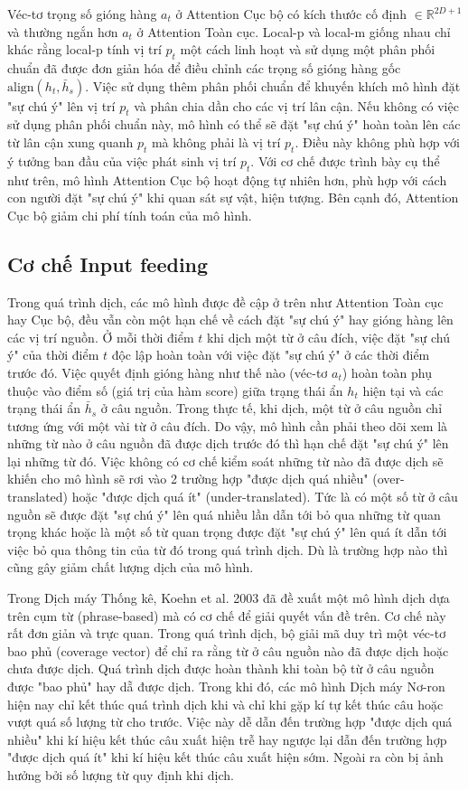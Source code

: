  Véc-tơ trọng số gióng hàng $a_t$ ở Attention Cục bộ có kích thước cố định $\in \mathbb{R}^{2D + 1}$ và thường ngắn hơn $a_t$ ở Attention Toàn cục. Local-p và local-m giống nhau chỉ khác rằng local-p tính vị trí $p_t$ một cách linh hoạt và sử dụng một phân phối chuẩn đã được đơn giản hóa để điều chỉnh các trọng số gióng hàng gốc $\text{align}(h_t, \bar{h}_s)$. Việc sử dụng thêm phân phối chuẩn để khuyến khích mô hình đặt "sự chú ý" lên vị trí $p_t$ và phân chia dần cho các vị trí lân cận. Nếu không có việc sử dụng phân phối chuẩn này, mô hình có thể sẽ đặt "sự chú ý" hoàn toàn lên các từ lân cận xung quanh $p_t$ mà không phải là vị trí $p_t$. Điều này không phù hợp với ý tưởng ban đầu của việc phát sinh vị trí $p_t$.
Với cơ chế được trình bày cụ thể như trên, mô hình Attention Cục bộ hoạt động tự nhiên hơn, phù hợp với cách con người đặt "sự chú ý" khi quan sát sự vật, hiện tượng. Bên cạnh đó, Attention Cục bộ giảm chi phí tính toán của mô hình.

\subsection{Cơ chế Input feeding}
Trong quá trình dịch, các mô hình được đề cập ở trên như Attention Toàn cục hay Cục bộ, đều vẫn còn một hạn chế về cách đặt "sự chú ý" hay gióng hàng lên các vị trí nguồn. Ở mỗi thời điểm $t$ khi dịch một từ ở câu đích, việc đặt "sự chú ý" của thời điểm $t$ độc lập hoàn toàn với việc đặt "sự chú ý" ở các thời điểm trước đó. Việc quyết định gióng hàng như thế nào (véc-tơ $a_t$) hoàn toàn phụ thuộc vào điểm số (giá trị của hàm score) giữa trạng thái ẩn $h_t$ hiện tại và các trạng thái ẩn $\bar{h}_s$ ở câu nguồn. Trong thực tế, khi dịch, một từ ở câu nguồn chỉ tương ứng với một vài từ ở câu đích. Do vậy, mô hình cần phải theo dõi xem là những từ nào ở câu nguồn đã được dịch trước đó thì hạn chế đặt "sự chú ý" lên lại những từ đó. Việc không có cơ chế kiểm soát những từ nào đã được dịch sẽ khiến cho mô hình sẽ rơi vào 2 trường hợp "được dịch quá nhiều" (over-translated) hoặc "được dịch quá ít" (under-translated). Tức là có một số từ ở câu nguồn sẽ được đặt "sự chú ý" lên quá nhiều lần dẫn tới bỏ qua những từ quan trọng khác hoặc là một số từ quan trọng được đặt "sự chú ý" lên quá ít dẫn tới việc bỏ qua thông tin của từ đó trong quá trình dịch. Dù là trường hợp nào thì cũng gây giảm chất lượng dịch của mô hình.

Trong Dịch máy Thống kê, Koehn et al. 2003 \cite{smtKoehn2003} đã đề xuất một mô hình dịch dựa trên cụm từ (phrase-based) mà có cơ chế để giải quyết vấn đề trên. Cơ chế này rất đơn giản và trực quan. Trong quá trình dịch, bộ giải mã duy trì một véc-tơ bao phủ (coverage vector) để chỉ ra rằng từ ở câu nguồn nào đã được dịch hoặc chưa được dịch. Quá trình dịch được hoàn thành khi toàn bộ từ ở câu nguồn được "bao phủ" hay dẵ được dịch. Trong khi đó, các mô hình Dịch máy Nơ-ron hiện nay chỉ kết thúc quá trình dịch khi và chỉ khi gặp kí tự kết thúc câu hoặc vượt quá số lượng từ cho trước. Việc này dễ dẫn đến trường hợp "được dịch quá nhiều" khi kí hiệu kết thúc câu xuất hiện trễ hay ngược lại dẫn đến trường hợp "được dịch quá ít" khi kí hiệu kết thúc câu xuất hiện sớm. Ngoài ra còn bị ảnh hưởng bởi số lượng từ quy định khi dịch.


